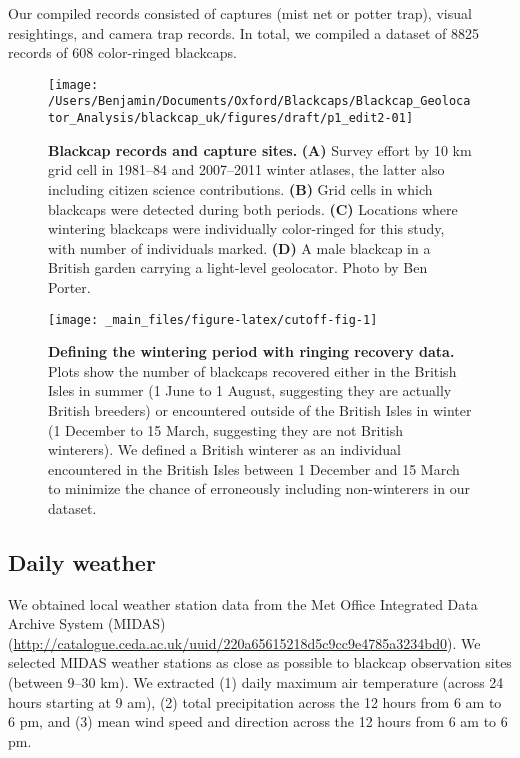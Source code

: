 \documentclass[a4paper, nobind]{templates/ociamthesis}
\begin{document}
Our compiled records consisted of captures (mist net or potter trap), visual resightings, and camera trap records. In total, we compiled a dataset of 8825 records of 608 color-ringed blackcaps.



\begin{figure}
\texttt{[image: /Users/Benjamin/Documents/Oxford/Blackcaps/Blackcap\_Geolocator\_Analysis/blackcap\_uk/figures/draft/p1\_edit2-01]} \caption{\textbf{Blackcap records and capture sites.} \textbf{(A)} Survey effort by 10 km grid cell in 1981--84 and 2007--2011 winter atlases, the latter also including citizen science contributions. \textbf{(B)} Grid cells in which blackcaps were detected during both periods. \textbf{(C)} Locations where wintering blackcaps were individually color-ringed for this study, with number of individuals marked. \textbf{(D)} A male blackcap in a British garden carrying a light-level geolocator. Photo by Ben Porter.}\label{fig:site-fig}
\end{figure}



\begin{figure}
\texttt{[image: \_main\_files/figure-latex/cutoff-fig-1]} \caption{\textbf{Defining the wintering period with ringing recovery data.} Plots show the number of blackcaps recovered either in the British Isles in summer (1 June to 1 August, suggesting they are actually British breeders) or encountered outside of the British Isles in winter (1 December to 15 March, suggesting they are not British winterers). We defined a British winterer as an individual encountered in the British Isles between 1 December and 15 March to minimize the chance of erroneously including non-winterers in our dataset.}\label{fig:cutoff-fig}
\end{figure}

\hypertarget{daily-weather}{%
\subsection{Daily weather}\label{daily-weather}}

We obtained local weather station data from the Met Office Integrated Data Archive System (MIDAS) \autocite{metofficeMetOfficeIntegrated2012} (\url{http://catalogue.ceda.ac.uk/uuid/220a65615218d5c9cc9e4785a3234bd0}). We selected MIDAS weather stations as close as possible to blackcap observation sites (between 9--30 km). We extracted (1) daily maximum air temperature (across 24 hours starting at 9 am), (2) total precipitation across the 12 hours from 6 am to 6 pm, and (3) mean wind speed and direction across the 12 hours from 6 am to 6 pm.
\end{document}

